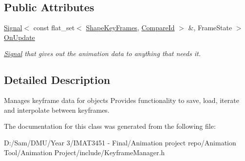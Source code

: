 \subsection*{Public Attributes}
\begin{DoxyCompactItemize}
\item 
\mbox{\label{class_keyframe_manager_a63db1d456f6f73bfc756583ac9ff6b2b}} 
\hyperlink{class_signal}{Signal}$<$ const flat\+\_\+set$<$ \hyperlink{struct_shape_key_frames}{Shape\+Key\+Frames}, \hyperlink{struct_compare_id}{Compare\+Id} $>$ \&, Frame\+State $>$ \hyperlink{class_keyframe_manager_a63db1d456f6f73bfc756583ac9ff6b2b}{On\+Update}
\begin{DoxyCompactList}\small\item\em \hyperlink{class_signal}{Signal} that gives out the animation data to anything that needs it. \end{DoxyCompactList}\end{DoxyCompactItemize}


\subsection{Detailed Description}
Manages keyframe data for objects Provides functionality to save, load, iterate and interpolate between keyframes. 

The documentation for this class was generated from the following file\+:\begin{DoxyCompactItemize}
\item 
D\+:/\+Sam/\+D\+M\+U/\+Year 3/\+I\+M\+A\+T3451 -\/ Final/\+Animation project repo/\+Animation Tool/\+Animation Project/include/Keyframe\+Manager.\+h\end{DoxyCompactItemize}
